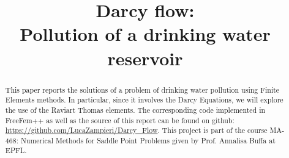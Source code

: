\documentclass[conference]{IEEEtran}
\begin{document}
%
\title{Darcy flow:\\ Pollution of a drinking water reservoir}

\author{
}

\maketitle
\vspace{-10cm}

\begin{abstract}
This paper reports the solutions of a problem of drinking water pollution using Finite Elements methods. In particular, since it involves the Darcy Equations, we will explore the use of the Raviart Thomas elements. The corresponding code implemented in FreeFem++ as well as the source of this report can be found on github: \url{https://github.com/LucaZampieri/Darcy_Flow}. This project is part of the course MA-468: Numerical Methods for Saddle Point Problems given by Prof. Annalisa Buffa at EPFL.

\end{abstract}
\IEEEpeerreviewmaketitle
\end{document}
